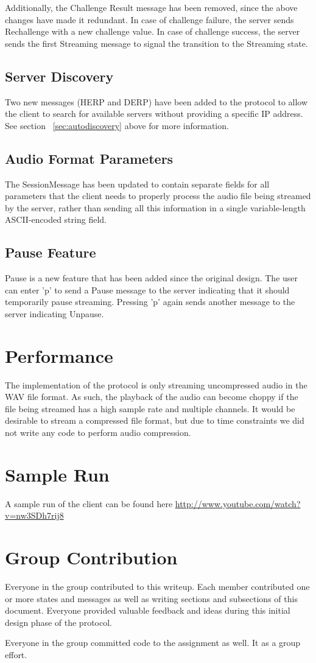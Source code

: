 \documentclass[12pt,letterpaper,titlepage]{article}
\begin{document}
Additionally, the Challenge Result message has been removed, since the above changes have made it redundant.  In case of challenge failure, the server sends Rechallenge with a new challenge value.  In case of challenge success, the server sends the first Streaming message to signal the transition to the Streaming state.

\subsection{Server Discovery}
Two new messages (HERP and DERP) have been added to the protocol to allow the client to search for available servers without providing a specific IP address.  See section ~\ref{sec:autodiscovery} above for more information.

\subsection{Audio Format Parameters}
The SessionMessage has been updated to contain separate fields for all parameters that the client needs to properly process the audio file being streamed by the server, rather than sending all this information in a single variable-length ASCII-encoded string field.

\subsection{Pause Feature}
Pause is a new feature that has been added since the original design.  The user can enter 'p' to send a Pause message to the server indicating that it should temporarily pause streaming.  Pressing 'p' again sends another message to the server indicating Unpause.

\section{Performance}
The implementation of the protocol is only streaming uncompressed audio in the WAV file format.
As such, the playback of the audio can become choppy if the file being streamed has a high
sample rate and multiple channels. It would be desirable to stream a compressed file format, but
due to time constraints we did not write any code to perform audio compression.

\section{Sample Run}
A sample run of the client can be found here \url{http://www.youtube.com/watch?v=nw3SDh7rij8}

\section{Group Contribution}
Everyone in the group contributed to this writeup. Each member contributed one or more states and messages as well as writing sections and subsections of this document. Everyone provided valuable feedback and ideas during this initial design phase of the protocol.

Everyone in the group committed code to the assignment as well. It as a group effort.
\end{document}
